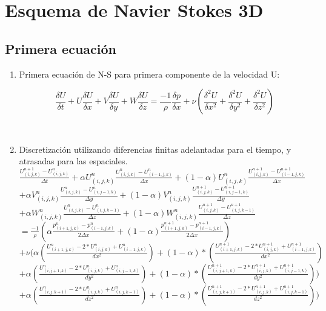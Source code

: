 \documentclass[a4paper]{article}
\begin{document}
\newpage
\section{Esquema de Navier Stokes 3D}
\subsection{Primera ecuación}

\begin{enumerate}

\item Primera ecuación de N-S para primera componente de la velocidad U:

$$ \frac{\delta U}{\delta t} + U \frac{\delta U}{\delta x} + V \frac{\delta U}{\delta y} + W \frac{\delta U}{\delta z} =  \frac{-1}{\rho} \frac{\delta p}{\delta x} + \nu (\frac{{\delta}^{2} U}{\delta {x}^{2}} + \frac{{\delta}^{2} U}{\delta {y}^{2}} + \frac{{\delta}^{2} U}{\delta {z}^{2}}) $$

~\\

\item Discretización utilizando diferencias finitas adelantadas para el tiempo, y atrasadas para las espaciales.
~\\
$ \frac{ {U}^{n+1}_{(i,j,k)} - U^{n}_{(i,j,k)}}{ \Delta t}  +  \alpha {U}^{n}_{(i,j,k)} \frac{ {U}^{n}_{(i,j,k)} - U^{n}_{(i-1,j,k)}}{ \Delta x} + (1 - \alpha) {U}^{n}_{(i,j,k)} \frac{ {U}^{n+1}_{(i,j,k)} - U^{n+1}_{(i-1,j,k)}}{ \Delta x}$ 
\\
$+ \alpha {V}^{n}_{(i,j,k)} \frac{ {U}^{n}_{(i,j,k)} - U^{n}_{(i,j-1,k)}}{ \Delta y} + (1 - \alpha) {V}^{n}_{(i,j,k)} \frac{ {U}^{n+1}_{(i,j,k)} - U^{n+1}_{(i,j-1,k)}}{ \Delta y}$
\\
$+ \alpha {W}^{n}_{(i,j,k)} \frac{ {U}^{n}_{(i,j,k)} - U^{n}_{(i,j,k-1)}}{ \Delta z} + (1 - \alpha) {W}^{n}_{(i,j,k)} \frac{ {U}^{n+1}_{(i,j,k)} - U^{n+1}_{(i,j,k-1)}}{ \Delta z}$
\\
$= \frac{-1}{\rho} ( \alpha \frac{p^{n}_{(i+1,j,k)} - p^{n}_{(i-1,j,k)} }{ 2 \Delta x } + (1 - \alpha) \frac{p^{n+1}_{(i+1,j,k)} - p^{n+1}_{(i-1,j,k)} }{ 2 \Delta x })  $
\\
$+ \nu (\alpha (\frac{ U^{n}_{(i+1,j,k)} - 2*U^{n}_{(i,j,k)} + U^{n}_{(i-1,j,k)}}{dx^2}) + (1-\alpha)*(\frac{ U^{n+1}_{(i+1,j,k)} - 2*U^{n+1}_{(i,j,k)} + U^{n+1}_{(i-1,j,k)}}{dx^2})$
\\
$+ \alpha (\frac{ U^{n}_{(i,j+1,k)} - 2*U^{n}_{(i,j,k)} + U^{n}_{(i,j-1,k)}}{dy^2}) + (1-\alpha)*(\frac{ U^{n+1}_{(i,j+1,k)} - 2*U^{n+1}_{(i,j,k)} + U^{n+1}_{(i,j-1,k)}}{dy^2}))$
\\
$+ \alpha (\frac{ U^{n}_{(i,j,k+1)} - 2*U^{n}_{(i,j,k)} + U^{n}_{(i,j,k-1)}}{dz^2}) + (1-\alpha)*(\frac{ U^{n+1}_{(i,j,k+1)} - 2*U^{n+1}_{(i,j,k)} + U^{n+1}_{(i,j,k-1)}}{dz^2}))$
~\\


\end{enumerate}
\end{document}

